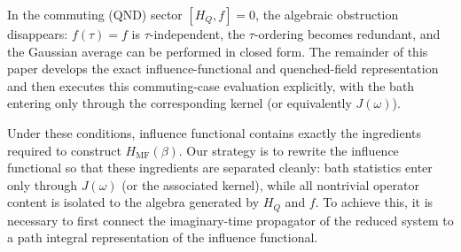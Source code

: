 In the commuting (QND) sector $[H_Q,f]=0$, the algebraic obstruction disappears:
$f(\tau)=f$ is $\tau$-independent, the $\tau$-ordering becomes redundant, and
the Gaussian average can be performed in closed form. The remainder of this
paper develops the exact influence-functional and quenched-field representation
and then executes this commuting-case evaluation explicitly, with the bath
entering only through the corresponding kernel (or equivalently $J(\omega)$).

Under these conditions, influence functional contains exactly the ingredients required
to construct $H_{\mathrm{MF}}(\beta)$. Our strategy is to rewrite the
influence functional so that these ingredients are separated cleanly: bath
statistics enter only through $J(\omega)$ (or the associated kernel), while all
nontrivial operator content is isolated to the algebra generated by $H_Q$ and
$f$. To achieve this, it is necessary to first connect the imaginary-time propagator of the reduced system to a path integral representation of the influence functional.
